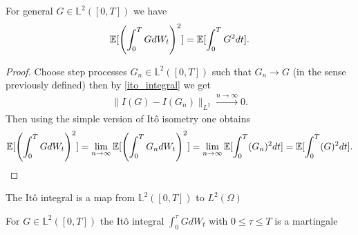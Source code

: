 \begin{lemma}[It\^o Isometry]
  For general $G \in  \mathbb{L}^2([0,T])$  we have 
  \begin{align*}
    \mathbb{E}[\left( \int_0^{T} G dW_t  \right)^2 ] = \mathbb{E}[\int_0^{T} G^2  dt ]
  .\end{align*}
\end{lemma}
\begin{proof}
  Choose step processes $G_{n} \in \mathbb{L}^2([0,T]) $  such that $G_{n} \to G $ (in the sense previously defined) then by \autoref{ito_integral} we get 
  \begin{align*}
    \|I(G) - I(G_n)\|_{L^2} \xrightarrow{n\to \infty} 0
  .\end{align*}
  Then using the simple version of It\^o isometry one obtains 
  \begin{align*}
    \E[\left(\int_0^{T} G dW_t\right)^2] = \lim_{n\to \infty} \E[\left( \int_0^{T} G_{n} dW_t   \right)^2 ]  = \lim_{n\to \infty} \E[\int_0^{T} (G_n)^2dt ] = \E[\int_0^{T} (G)^2dt ]
  .\end{align*}
\end{proof}
\begin{remark}
  The It\^o integral is a map from $\mathbb{L}^2([0,T]) $  to $L^2(\Omega )$
\end{remark}
\begin{remark}
  For $G \in \mathbb{L}^2([0,T])$  the It\^o integral $\int_0^{\tau } G dW_t $ with $0 \le \tau  \le T$ is a martingale
\end{remark}
